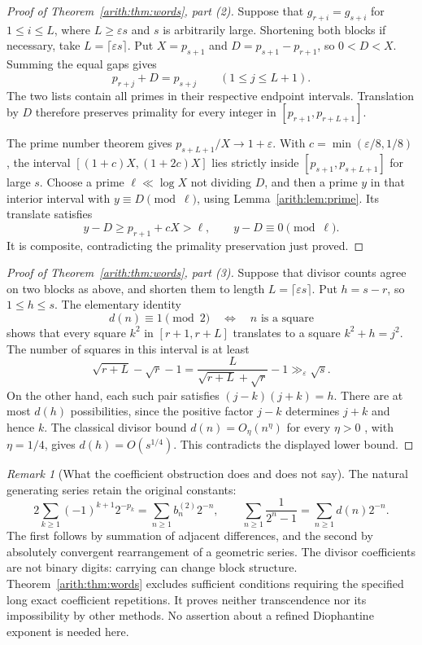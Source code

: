 \documentclass[11pt,a4paper]{article}
\theoremstyle{definition}\newtheorem{definition}[theorem]{Definition}
\theoremstyle{remark}\newtheorem{remark}[theorem]{Remark}
\begin{document}
\begin{proof}[Proof of Theorem~\ref{arith:thm:words}, part (2)]
Suppose that $g_{r+i}=g_{s+i}$ for $1\le i\le L$, where
$L\ge\varepsilon s$ and $s$ is arbitrarily large.  Shortening both
blocks if necessary, take $L=\lceil\varepsilon s\rceil$.
Put $X=p_{s+1}$ and $D=p_{s+1}-p_{r+1}$, so $0<D<X$.
Summing the equal gaps gives
\begin{equation}\label{arith:eq:translated-primes}
 p_{r+j}+D=p_{s+j}\qquad(1\le j\le L+1).
\end{equation}
The two lists contain all primes in their respective endpoint intervals.
Translation by $D$ therefore preserves primality for every integer in
$[p_{r+1},p_{r+L+1}]$.

The prime number theorem gives
$p_{s+L+1}/X\longrightarrow1+\varepsilon$.
With $c=\min(\varepsilon/8,1/8)$, the interval
$[(1+c)X,(1+2c)X]$ lies strictly inside
$[p_{s+1},p_{s+L+1}]$ for large $s$.
Choose a prime $\ell\ll\log X$ not dividing $D$, and then a prime
$y$ in that interior interval with $y\equiv D\pmod\ell$, using
Lemma~\ref{arith:lem:prime}.  Its translate satisfies
\[
 y-D\ge p_{r+1}+cX>\ell,\qquad y-D\equiv0\pmod\ell.
\]
It is composite, contradicting the primality preservation just proved.
\end{proof}

\begin{proof}[Proof of Theorem~\ref{arith:thm:words}, part (3)]
Suppose that divisor counts agree on two blocks as above, and shorten
them to length $L=\lceil\varepsilon s\rceil$.  Put $h=s-r$, so
$1\le h\le s$.  The elementary identity
\[
 d(n)\equiv1\pmod2\quad\Longleftrightarrow\quad n\text{ is a square}
\]
shows that every square $k^2$ in $[r+1,r+L]$ translates to a square
$k^2+h=j^2$.
The number of squares in this interval is at least
\[
 \sqrt{r+L}-\sqrt r-1
 =\frac{L}{\sqrt{r+L}+\sqrt r}-1
 \gg_{\varepsilon}\sqrt s.
\]
On the other hand, each such pair satisfies
$(j-k)(j+k)=h$.  There are at most $d(h)$ possibilities, since the
positive factor $j-k$ determines $j+k$ and hence $k$.
The classical divisor bound $d(n)=O_{\eta}(n^{\eta})$ for every
$\eta>0$ \cite{ArithHW}, with $\eta=1/4$, gives
$d(h)=O(s^{1/4})$.  This contradicts the displayed lower bound.
\end{proof}

\begin{remark}[What the coefficient obstruction does and does not say]
The natural generating series retain the original constants:
\[
 2\sum_{k\ge1}(-1)^{k+1}2^{-p_k}
       =\sum_{n\ge1}b_n^{(2)}2^{-n},\qquad
 \sum_{n\ge1}\frac1{2^n-1}=\sum_{n\ge1}d(n)2^{-n}.
\]
The first follows by summation of adjacent differences, and the second
by absolutely convergent rearrangement of a geometric series.
The divisor coefficients are not binary digits: carrying can change
block structure.  Theorem~\ref{arith:thm:words} excludes sufficient
conditions requiring the specified long exact coefficient repetitions.
It proves neither transcendence nor its impossibility by other methods.
No assertion about a refined Diophantine exponent is needed here.
\end{remark}
\end{document}
